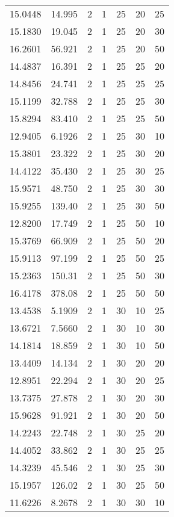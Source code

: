 \documentclass[11pt]{article}
\begin{document}
\begin{center}
\begin{longtable}{rrccccc}
15.0448    & 14.995   &  2 & 1 &  25 & 20 & 25	\\ 
15.1830    & 19.045   &  2 & 1 &  25 & 20 & 30	\\ 
16.2601    & 56.921   &  2 & 1 &  25 & 20 & 50	\\ 
14.4837    & 16.391   &  2 & 1 &  25 & 25 & 20	\\ 
14.8456    & 24.741   &  2 & 1 &  25 & 25 & 25	\\ 
15.1199    & 32.788   &  2 & 1 &  25 & 25 & 30	\\ 
15.8294    & 83.410   &  2 & 1 &  25 & 25 & 50	\\ 
12.9405    & 6.1926   &  2 & 1 &  25 & 30 & 10	\\ 
15.3801    & 23.322   &  2 & 1 &  25 & 30 & 20	\\ 
14.4122    & 35.430   &  2 & 1 &  25 & 30 & 25	\\ 
15.9571    & 48.750   &  2 & 1 &  25 & 30 & 30	\\ 
15.9255    & 139.40   &  2 & 1 &  25 & 30 & 50	\\ 
12.8200    & 17.749   &  2 & 1 &  25 & 50 & 10	\\ 
15.3769    & 66.909   &  2 & 1 &  25 & 50 & 20	\\ 
15.9113    & 97.199   &  2 & 1 &  25 & 50 & 25	\\ 
15.2363    & 150.31   &  2 & 1 &  25 & 50 & 30	\\ 
16.4178    & 378.08   &  2 & 1 &  25 & 50 & 50	\\ 
13.4538    & 5.1909   &  2 & 1 &  30 & 10 & 25	\\ 
13.6721    & 7.5660   &  2 & 1 &  30 & 10 & 30	\\ 
14.1814    & 18.859   &  2 & 1 &  30 & 10 & 50	\\ 
13.4409    & 14.134   &  2 & 1 &  30 & 20 & 20	\\ 
12.8951    & 22.294   &  2 & 1 &  30 & 20 & 25	\\ 
13.7375    & 27.878   &  2 & 1 &  30 & 20 & 30	\\ 
15.9628    & 91.921   &  2 & 1 &  30 & 20 & 50	\\ 
14.2243    & 22.748   &  2 & 1 &  30 & 25 & 20	\\ 
14.4052    & 33.862   &  2 & 1 &  30 & 25 & 25	\\ 
14.3239    & 45.546   &  2 & 1 &  30 & 25 & 30	\\ 
15.1957    & 126.02   &  2 & 1 &  30 & 25 & 50	\\ 
11.6226    & 8.2678   &  2 & 1 &  30 & 30 & 10	\\ 

\end{longtable}
\end{center}
\end{document}
